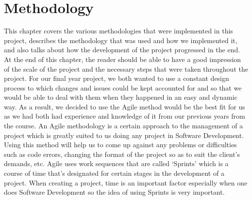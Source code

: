 \chapter{Methodology}
This chapter covers the various methodologies that were implemented in this project, describes the methodology that was used and how we implemented it, and also talks about how the development of the project progressed in the end. At the end of this chapter, the reader should be able to have a good impression of the scale of the project and the necessary steps that were taken throughout the project. For our final year project, we both wanted to use a constant design process to which changes and issues could be kept accounted for and so that we would be able to deal with them when they happened in an easy and dynamic way. As a result, we decided to use the Agile method would be the best fit for us as we had both had experience and knowledge of it from our previous years from the course. An Agile methodology is a certain approach to the management of a project which is greatly suited to us doing any project in Software Development. Using this method will help us to come up against any problems or difficulties such as code errors, changing the format of the project so as to suit the client's demands, etc. Agile uses work sequences that are called ‘Sprints’ which is a course of time that’s designated for certain stages in the development of a project. When creating a project, time is an important factor especially when one does Software Development so the idea of using Sprints is very important.

